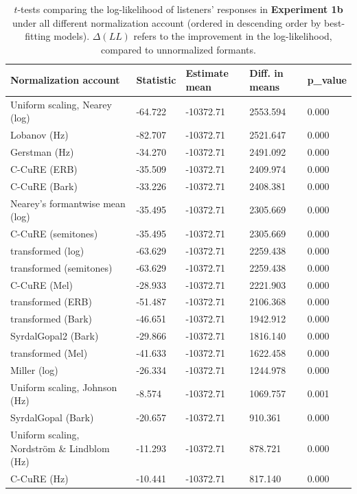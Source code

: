 \documentclass[preprint]{JASA}
\begin{document}
\begin{table}
\caption{\label{tab:SI-ttest-1b}$t$-tests comparing the log-likelihood of listeners' responses in \textbf{Experiment 1b} under all different normalization account (ordered in descending order by best-fitting models). $\Delta(LL)$ refers to the improvement in the log-likelihood, compared to unnormalized formants.}
\centering
\small
\begin{tabular}{p{6cm}p{2cm}p{3cm}p{3cm}p{2cm}}
\toprule
Normalization account & Statistic & Estimate mean & Diff. in means & p\_value\\
\midrule
Uniform scaling, Nearey (log) & -64.722 & -10372.71 & 2553.594 & 0.000\\
Lobanov (Hz) & -82.707 & -10372.71 & 2521.647 & 0.000\\
Gerstman (Hz) & -34.270 & -10372.71 & 2491.092 & 0.000\\
C-CuRE (ERB) & -35.509 & -10372.71 & 2409.974 & 0.000\\
C-CuRE (Bark) & -33.226 & -10372.71 & 2408.381 & 0.000\\
Nearey's formantwise mean (log) & -35.495 & -10372.71 & 2305.669 & 0.000\\
C-CuRE (semitones) & -35.495 & -10372.71 & 2305.669 & 0.000\\
transformed (log) & -63.629 & -10372.71 & 2259.438 & 0.000\\
transformed (semitones) & -63.629 & -10372.71 & 2259.438 & 0.000\\
C-CuRE (Mel) & -28.933 & -10372.71 & 2221.903 & 0.000\\
transformed (ERB) & -51.487 & -10372.71 & 2106.368 & 0.000\\
transformed (Bark) & -46.651 & -10372.71 & 1942.912 & 0.000\\
SyrdalGopal2 (Bark) & -29.866 & -10372.71 & 1816.140 & 0.000\\
transformed (Mel) & -41.633 & -10372.71 & 1622.458 & 0.000\\
Miller (log) & -26.334 & -10372.71 & 1244.978 & 0.000\\
Uniform scaling, Johnson (Hz) & -8.574 & -10372.71 & 1069.757 & 0.001\\
SyrdalGopal (Bark) & -20.657 & -10372.71 & 910.361 & 0.000\\
Uniform scaling, Nordström \& Lindblom (Hz) & -11.293 & -10372.71 & 878.721 & 0.000\\
C-CuRE (Hz) & -10.441 & -10372.71 & 817.140 & 0.000\\
\bottomrule
\end{tabular}
\end{table}
\end{document}

